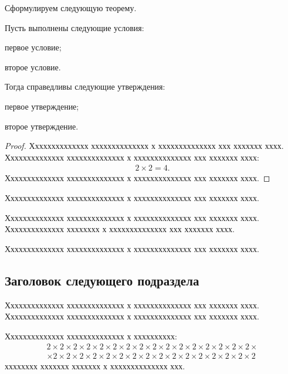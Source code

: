 \documentclass[12pt]{a&t}
\begin{document}
Сформулируем следующую теорему.

\begin{theorem} %
Пусть выполнены следующие условия:

\begin{ruslist}
\item
первое условие;

\item
второе условие.
\end{ruslist}

Тогда справедливы следующие утверждения:

\begin{enumlist}
\item
первое утверждение;

\item
второе утверждение.
\end{enumlist}
\end{theorem}

\begin{proof}
Хххххххххххххх хххххххххххххх х хххххххххххххх ххх ххххххх хххх.
Хххххххххххххх хххххххххххххх х хххххххххххххх ххх ххххххх хххх:
\begin{gather}
    2\times 2=4.
\end{gather}
Хххххххххххххх хххххххххххххх х хххххххххххххх ххх ххххххх хххх.
\end{proof}

Хххххххххххххх хххххххххххххх х хххххххххххххх ххх ххххххх хххх.

\begin{corollary}
Хххххххххххххх хххххххххххххх х хххххххххххххх ххх ххххххх хххх.
Хххххххххххххх хххххххх х хххххххххххххх ххх ххххххх хххх.
\end{corollary}

Хххххххххххххх хххххххххххххх х хххххххххххххх ххх ххххххх хххх.


\subsection{Заголовок следующего подраздела}

Хххххххххххххх хххххххххххххх х хххххххххххххх ххх ххххххх хххх.
Хххххххххххххх хххххххххххххх х хххххххххххххх ххх ххххххх хххх.

\begin{lemma} \label{lm:1}
Хххххххххххххх хххххххххххххх х хххххххххх:
\begin{multline}
    2\times 2\times 2\times 2\times 2\times 2\times 2\times 2\times
    2\times 2\times 2\times 2\times 2\times 2\times 2\times 2\times
\\
    \times 2\times 2\times 2\times 2\times 2\times 2\times 2\times 2\times
    2\times 2\times 2\times 2\times 2\times 2\times 2\times 2
\end{multline}
хххххххх ххххххх ххххххх х хххххххххххххх ххх.
\end{lemma}
\end{document}
